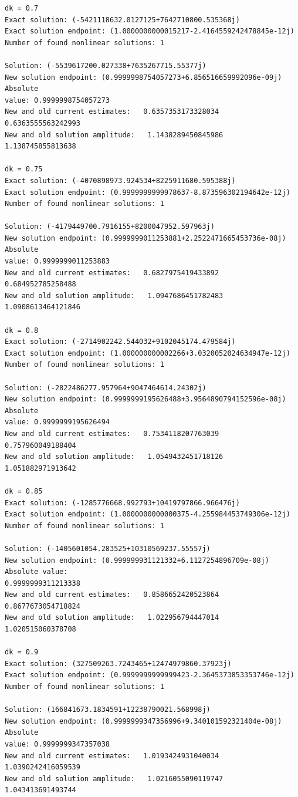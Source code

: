 \documentclass[11pt]{article}
\begin{document}
\begin{Verbatim}[commandchars=\\\{\}]
dk = 0.7
Exact solution: (-5421118632.0127125+7642710800.535368j)
Exact solution endpoint: (1.0000000000015217-2.4164559242478845e-12j)
Number of found nonlinear solutions: 1

Solution: (-5539617200.027338+7635267715.55377j)
New solution endpoint: (0.9999998754057273+6.856516659992096e-09j) Absolute
value: 0.9999998754057273
New and old current estimates:   0.6357353173328034    0.6363555563242993
New and old solution amplitude:   1.1438289450845986    1.138745855813638

dk = 0.75
Exact solution: (-4070898973.924534+8225911680.595388j)
Exact solution endpoint: (0.9999999999978637-8.873596302194642e-12j)
Number of found nonlinear solutions: 1

Solution: (-4179449700.7916155+8200047952.597963j)
New solution endpoint: (0.9999999011253881+2.2522471665453736e-08j) Absolute
value: 0.9999999011253883
New and old current estimates:   0.6827975419433892    0.684952785258488
New and old solution amplitude:   1.0947686451782483    1.0908613464121846

dk = 0.8
Exact solution: (-2714902242.544032+9102045174.479584j)
Exact solution endpoint: (1.000000000002266+3.0320052024634947e-12j)
Number of found nonlinear solutions: 1

Solution: (-2822486277.957964+9047464614.24302j)
New solution endpoint: (0.9999999195626488+3.9564890794152596e-08j) Absolute
value: 0.9999999195626494
New and old current estimates:   0.7534118207763039    0.757960049188404
New and old solution amplitude:   1.0549432451718126    1.051882971913642

dk = 0.85
Exact solution: (-1285776668.992793+10419797866.966476j)
Exact solution endpoint: (1.0000000000000375-4.255984453749306e-12j)
Number of found nonlinear solutions: 1

Solution: (-1405601054.283525+10310569237.55557j)
New solution endpoint: (0.999999931121332+6.1127254896709e-08j) Absolute value:
0.9999999311213338
New and old current estimates:   0.8586652420523864    0.8677673054718824
New and old solution amplitude:   1.022956794447014    1.020515060378708

dk = 0.9
Exact solution: (327509263.7243465+12474979860.37923j)
Exact solution endpoint: (0.9999999999999423-2.3645373853353746e-12j)
Number of found nonlinear solutions: 1

Solution: (166841673.1834591+12238790021.568998j)
New solution endpoint: (0.9999999347356996+9.340101592321404e-08j) Absolute
value: 0.9999999347357038
New and old current estimates:   1.0193424931040034    1.0390242416059539
New and old solution amplitude:   1.0216055090119747    1.043413691493744

    \end{Verbatim}
\end{document}
